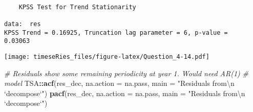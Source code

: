 \documentclass[]{book}
\newenvironment{Shaded}{\begin{snugshade}}{\end{snugshade}}
\newcommand{\CharTok}[1]{\textcolor[rgb]{0.31,0.60,0.02}{#1}}
\newcommand{\CommentTok}[1]{\textcolor[rgb]{0.56,0.35,0.01}{\textit{#1}}}
\newcommand{\DataTypeTok}[1]{\textcolor[rgb]{0.13,0.29,0.53}{#1}}
\newcommand{\DecValTok}[1]{\textcolor[rgb]{0.00,0.00,0.81}{#1}}
\newcommand{\KeywordTok}[1]{\textcolor[rgb]{0.13,0.29,0.53}{\textbf{#1}}}
\newcommand{\NormalTok}[1]{#1}
\newcommand{\OperatorTok}[1]{\textcolor[rgb]{0.81,0.36,0.00}{\textbf{#1}}}
\newcommand{\StringTok}[1]{\textcolor[rgb]{0.31,0.60,0.02}{#1}}
\begin{document}
\begin{verbatim}

    KPSS Test for Trend Stationarity

data:  res
KPSS Trend = 0.16925, Truncation lag parameter = 6, p-value =
0.03063
\end{verbatim}

\begin{Shaded}
\end{Shaded}

\texttt{[image: timeseRies\_files/figure-latex/Question\_4-14.pdf]}

\begin{Shaded}
\begin{Highlighting}[]
\CommentTok{# Residuals show some remaining periodicity at year 1. Would need AR(1)}
\CommentTok{# model}
\NormalTok{TSA}\OperatorTok{::}\KeywordTok{acf}\NormalTok{(res_dec, }\DataTypeTok{na.action =}\NormalTok{ na.pass, }\DataTypeTok{main =} \StringTok{"Residuals from}\CharTok{\textbackslash{}n}\StringTok{ `decompose`"}\NormalTok{)}
\KeywordTok{pacf}\NormalTok{(res_dec, }\DataTypeTok{na.action =}\NormalTok{ na.pass, }\DataTypeTok{main =} \StringTok{"Residuals from}\CharTok{\textbackslash{}n}\StringTok{ `decompose`"}\NormalTok{)}
\end{Highlighting}
\end{Shaded}
\end{document}
